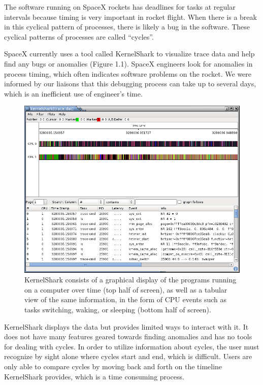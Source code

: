\documentclass{hmcclinic}
\begin{document}
The software running on SpaceX rockets has deadlines for tasks at regular
intervals because timing is very important in rocket flight. When there is a
break in this cyclical pattern of processes, there is likely a bug in the
software. These cyclical patterns of processes are called ``cycles''.

SpaceX currently uses a tool called KernelShark %
to visualize trace data and help find any bugs or anomalies (Figure 1.1). 
SpaceX engineers look for anomalies in process timing, which often indicates 
software problems on the rocket. We were informed by our liaisons that this
 debugging process can take up to several days, 
which is an inefficient use of engineer's time. \\

\begin{figure}[H]
  \centering
      \includegraphics[width=4.95in]{kshark-open.png}
  \caption{KernelShark consists of a graphical display of the programs running on a computer over time (top half of screen), as well as a tabular view of the same information, in the form of CPU events such as tasks switching, waking, or sleeping (bottom half of screen).}
\end{figure}

KernelShark displays the data but provides limited ways to interact with it. It
does not have many features geared towards finding anomalies and has no tools for
dealing with cycles.  In order to utilize information about cycles, the user
must recognize by sight alone where cycles start and end, which is
difficult. Users are only able to compare cycles by moving back and forth on
the timeline KernelShark provides, which is a time consuming process.
\end{document}
